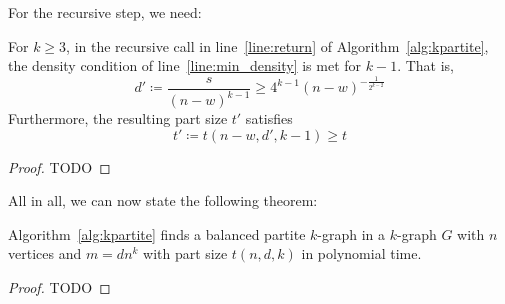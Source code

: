 For the recursive step, we need:

\begin{lemma}
    For $k \geq 3$, in the recursive call in line~\ref{line:return} of Algorithm~\ref{alg:kpartite},
    the density condition of line~\ref{line:min_density} is met for $k-1$.
    That is,
    \[
        d' \coloneqq \frac{s}{(n-w)^{k-1}} \geq 4^{k-1} (n-w)^{-\frac{1}{2^{k-2}}}
    \]
    Furthermore,
    the resulting part size $t'$ satisfies
    \[
        t' \coloneqq t(n - w, d', k - 1) \geq t
    \]
    \begin{proof}
        TODO %
    \end{proof}

\end{lemma}

All in all, we can now state the following theorem:

\begin{theorem}
    Algorithm~\ref{alg:kpartite} finds a balanced partite $k$-graph in a $k$-graph $G$ with
    $n$ vertices and $m = d n^k$ with part size $t(n, d, k)$ in polynomial time.
    \begin{proof}
        TODO %
    \end{proof}
\end{theorem}





